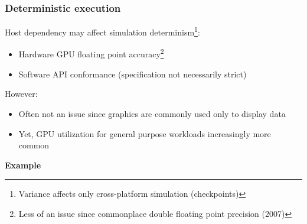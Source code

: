 
\begin{frame}

\frametitle{Deterministic execution}

Host dependency may affect simulation determinism\footnote{Variance affects only cross-platform simulation (checkpoints)}:
\begin{itemize}
	\item Hardware GPU floating point accuracy\footnote{Less of an issue since commonplace double floating point precision (2007)}
	\item Software API conformance (specification not necessarily strict)
\end{itemize}

However:
\begin{itemize}
	\item Often not an issue since graphics are commonly used only to display data
	\item Yet, GPU utilization for general purpose workloads increasingly more common
\end{itemize}

\textbf{Example}

\end{frame}
